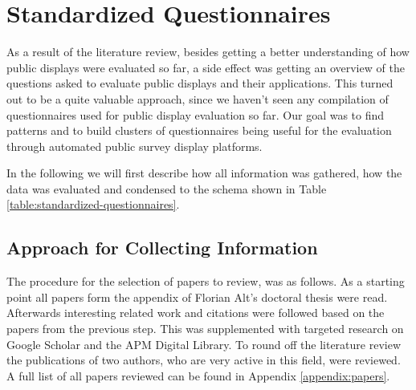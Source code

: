 \section{Standardized Questionnaires}
\label{sec:questionnaires}

As a result of the literature review, besides getting a better understanding of how public displays were evaluated so far, a side effect was getting an overview of the questions asked to evaluate public displays and their applications. This turned out to be a quite valuable approach, since we haven't seen any compilation of questionnaires used for public display evaluation so far. Our goal was to find patterns and to build clusters of questionnaires being useful for the evaluation through automated public survey display platforms.

In the following we will first describe how all information was gathered, how the data was evaluated and condensed to the schema shown in Table \ref{table:standardized-questionnaires}.





\subsection{Approach for Collecting Information}

	The procedure for the selection of papers to review, was as follows. As a starting point all papers form the appendix of Florian Alt's doctoral thesis \cite{alt2013thesis} were read. Afterwards interesting related work and citations were followed based on the papers from the previous step. This was supplemented with targeted research on Google Scholar and the APM Digital Library. To round off the literature review the publications of two authors, who are very active in this field, were reviewed. A full list of all papers reviewed can be found in Appendix \ref{appendix:papers}.

